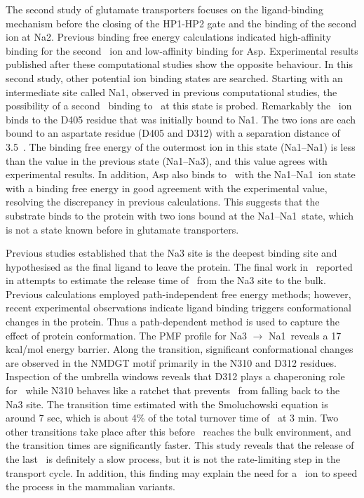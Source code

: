 The second study of glutamate transporters focuses on the ligand-binding mechanism before 
the closing of the HP1-HP2 gate and the binding of the second ion at Na2. Previous binding 
free energy calculations indicated high-affinity binding for the second \Na\ ion and 
low-affinity binding for Asp. Experimental results published after these computational 
studies show the opposite behaviour. In this second study, other potential ion binding 
states are searched. Starting with an intermediate site called Na1\prim, observed in 
previous computational studies, the possibility of a second \Na\ binding to \GltPh\ at this 
state is probed. Remarkably the \Na\ ion binds to the D405 residue that was initially bound 
to Na1\prim. The two ions are each bound to an aspartate residue (D405 and D312) with a 
separation distance of 3.5~\angs. The binding free energy of the outermost ion in this state 
(Na1--Na1\prim) is less than the value in the previous state (Na1--Na3), and this value agrees 
with experimental results. In addition, Asp also binds to \GltPh\ with the Na1--Na1\prim\ ion 
state with a binding free energy in good agreement with the experimental value, resolving the 
discrepancy in previous calculations. This suggests that the substrate binds to the protein 
with two ions bound at the Na1--Na1\prim\ state, which is not a state known before in glutamate 
transporters.

Previous studies established that the Na3 site is the deepest binding site and hypothesised 
as the final ligand to leave the protein. The final work in \GltPh\ reported in 
 attempts to estimate the release time of \Na\ from the Na3 site to the 
bulk. Previous calculations employed path-independent free energy methods; however, recent 
experimental observations indicate ligand binding triggers conformational changes in the 
protein. Thus a path-dependent method is used to capture the effect of protein conformation. 
The PMF profile for Na3 $\rightarrow$ Na1\prim\ reveals a 17 kcal/mol energy barrier. Along 
the transition, significant conformational changes are observed in the NMDGT motif primarily 
in the N310 and D312 residues. Inspection of the umbrella windows reveals that D312 plays a 
chaperoning role for \Na\ while N310 behaves like a ratchet that prevents \Na\ from falling 
back to the Na3 site. The transition time estimated with the Smoluchowski equation is around 
7 sec, which is about 4\% of the total turnover time of \GltPh\ at 3 min. Two other transitions 
take place after this before \Na\ reaches the bulk environment, and the transition times are 
significantly faster. This study reveals that the release of the last \Na\ is definitely a slow 
process, but it is not the rate-limiting step in the transport cycle. In addition, this finding 
may explain the need for a \K\ ion to speed the process in the mammalian variants.

